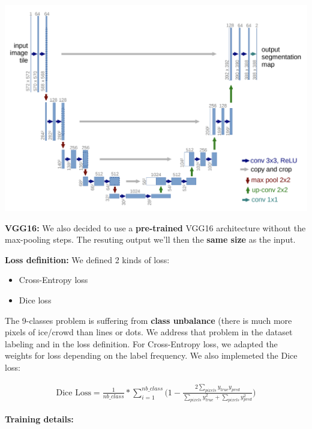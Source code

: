\documentclass[25pt, a0paper,
               colspace=15mm, subcolspace=0mm,
               blockverticalspace=17mm]{tikzposter} %
\begin{document}
\begin{columns}
{\begin{multicols}{2}
  		\vspace{10mm}
  		{\centering \includegraphics[width=1.0\linewidth]{figures/unet-architecture.png}}
  		
  		\textbf{VGG16:} We also decided to use a \textbf{pre-trained} VGG16 architecture without the max-pooling steps. The resuting output we'll then the \textbf{same size} as the input.
  		  		
  		\columnbreak
  		
  		\textbf{Loss definition:} We defined 2 kinds of loss:
  		\begin{itemize}
  			\item Cross-Entropy loss
  			\item Dice loss
  		\end{itemize}
  	
		The 9-classes problem is suffering from \textbf{class unbalance} (there is much more pixels of ice/crowd than lines or dots. We address that problem in the dataset labeling and in the loss definition. For Cross-Entropy loss, we adapted the weights for loss depending on the label frequency. We also implemeted the Dice loss:
		
		  \vspace{-15mm}
		\begin{gather*}
			\text{Dice Loss} = \frac{1}{nb\_class}*\sum\limits_{i=1}^{nb\_class}\Big(1-\frac{2\sum\limits_{pixels}y_{true}y_{pred}}{\sum\limits_{pixels}y_{true}^{2}+\sum\limits_{pixels}y_{pred}^{2}}\Big)
		\end{gather*}
  		
  		\textbf{Training details:}
  		
  	\end{multicols}
  
  
  }
  




\end{columns}
\end{document}

